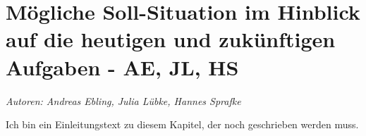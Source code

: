 \chapter{Mögliche Soll-Situation im Hinblick auf die heutigen und zukünftigen Aufgaben - AE, JL, HS}

\textit{Autoren: Andreas Ebling, Julia Lübke, Hannes Sprafke}

Ich bin ein Einleitungstext zu diesem Kapitel, der noch geschrieben werden muss.





